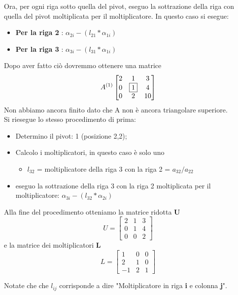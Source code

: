 Ora, per ogni riga sotto quella del pivot, eseguo la sottrazione della riga con quella del pivot moltiplicata per il moltiplicatore. In questo caso si esegue:
\begin{itemize}
\item \textbf{Per la riga 2 }: $\alpha_{2i}-(l_{21}*\alpha_{1i})$
\item \textbf{Per la riga 3 }: $\alpha_{3i}-(l_{31}*\alpha_{1i})$
\end{itemize}

Dopo aver fatto ciò dovremmo ottenere una matrice
$$ A^{(1)}
\begin{bmatrix}
2 & 1 & 3 \\
0 & \fbox{1} & 4 \\
0 & 2 & 10 
\end{bmatrix}
$$
\noindent
Non abbiamo ancora finito dato che A non è ancora triangolare superiore. 
\\
Si riesegue lo stesso procedimento di prima:
\begin{itemize}
\item Determino il pivot: 1 (posizione 2,2);
\item Calcolo i moltiplicatori, in questo caso è solo uno
	\begin{itemize}
		\item $l_{32}$ =  moltiplicatore della riga 3 con la riga 2 = $a_{32}/a_{22}$
	\end{itemize}
\item eseguo la sottrazione della riga 3 con la riga 2 moltiplicata per il moltiplicatore: $\alpha_{3i}-(l_{32}*\alpha_{2i})$
\end{itemize}

\noindent
Alla fine del procedimento otteniamo la matrice ridotta \textbf{U}
$$ U =
\begin{bmatrix}
2 & 1 & 3 \\
0 & 1 & 4 \\
0 & 0 & 2 
\end{bmatrix}
$$
\noindent
e la matrice dei moltiplicatori \textbf{L}
$$ L =
\begin{bmatrix}
1 & 0 & 0 \\
2 & 1 & 0 \\
-1 & 2 & 1 
\end{bmatrix}
$$

\noindent
Notate che che $l_{ij}$ corrisponde a dire "Moltiplicatore in riga \textbf{i} e colonna \textbf{j}".

